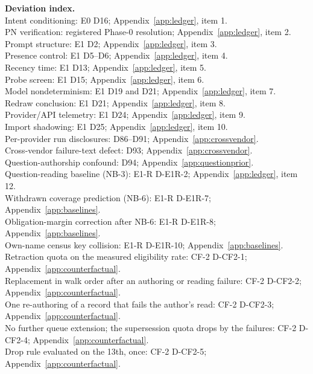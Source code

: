 \documentclass{article}
\begin{document}
\noindent\textbf{Deviation index.}\\
Intent conditioning: E0 D16; Appendix~\ref{app:ledger}, item 1.\\
PN verification: registered Phase-0 resolution; Appendix~\ref{app:ledger}, item 2.\\
Prompt structure: E1 D2; Appendix~\ref{app:ledger}, item 3.\\
Presence control: E1 D5--D6; Appendix~\ref{app:ledger}, item 4.\\
Recency time: E1 D13; Appendix~\ref{app:ledger}, item 5.\\
Probe screen: E1 D15; Appendix~\ref{app:ledger}, item 6.\\
Model nondeterminism: E1 D19 and D21; Appendix~\ref{app:ledger}, item 7.\\
Redraw conclusion: E1 D21; Appendix~\ref{app:ledger}, item 8.\\
Provider/API telemetry: E1 D24; Appendix~\ref{app:ledger}, item 9.\\
Import shadowing: E1 D25; Appendix~\ref{app:ledger}, item 10.\\
Per-provider run disclosures: D86--D91; Appendix~\ref{app:crossvendor}.\\
Cross-vendor failure-text defect: D93; Appendix~\ref{app:crossvendor}.\\
Question-authorship confound: D94; Appendix~\ref{app:questionprior}.\\
Question-reading baseline (NB-3): E1-R D-E1R-2; Appendix~\ref{app:ledger}, item 12.\\
Withdrawn coverage prediction (NB-6): E1-R D-E1R-7; Appendix~\ref{app:baselines}.\\
Obligation-margin correction after NB-6: E1-R D-E1R-8; Appendix~\ref{app:baselines}.\\
Own-name census key collision: E1-R D-E1R-10; Appendix~\ref{app:baselines}.\\
Retraction quota on the measured eligibility rate: CF-2 D-CF2-1; Appendix~\ref{app:counterfactual}.\\
Replacement in walk order after an authoring or reading failure: CF-2 D-CF2-2; Appendix~\ref{app:counterfactual}.\\
One re-authoring of a record that fails the author's read: CF-2 D-CF2-3; Appendix~\ref{app:counterfactual}.\\
No further queue extension; the supersession quota drops by the failures: CF-2 D-CF2-4; Appendix~\ref{app:counterfactual}.\\
Drop rule evaluated on the 13th, once: CF-2 D-CF2-5; Appendix~\ref{app:counterfactual}.\\
\end{document}

